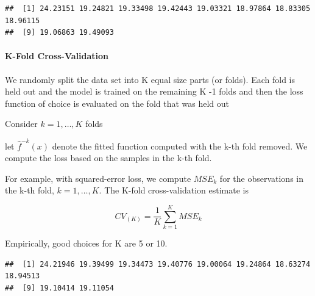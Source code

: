 \documentclass[
]{book}
\newenvironment{Shaded}{\begin{snugshade}}{\end{snugshade}}
\newcommand{\AttributeTok}[1]{\textcolor[rgb]{0.77,0.63,0.00}{#1}}
\newcommand{\CommentTok}[1]{\textcolor[rgb]{0.56,0.35,0.01}{\textit{#1}}}
\newcommand{\ControlFlowTok}[1]{\textcolor[rgb]{0.13,0.29,0.53}{\textbf{#1}}}
\newcommand{\DecValTok}[1]{\textcolor[rgb]{0.00,0.00,0.81}{#1}}
\newcommand{\FloatTok}[1]{\textcolor[rgb]{0.00,0.00,0.81}{#1}}
\newcommand{\FunctionTok}[1]{\textcolor[rgb]{0.00,0.00,0.00}{#1}}
\newcommand{\NormalTok}[1]{#1}
\newcommand{\OtherTok}[1]{\textcolor[rgb]{0.56,0.35,0.01}{#1}}
\newcommand{\SpecialCharTok}[1]{\textcolor[rgb]{0.00,0.00,0.00}{#1}}
\begin{document}
\begin{verbatim}
##  [1] 24.23151 19.24821 19.33498 19.42443 19.03321 18.97864 18.83305 18.96115
##  [9] 19.06863 19.49093
\end{verbatim}

\hypertarget{k-fold-cross-validation}{%
\paragraph{K-Fold Cross-Validation}\label{k-fold-cross-validation}}

We randomly split the data set into K equal size parts (or folds). Each fold is held out and the model is trained on the remaining K -1 folds and then the loss function of choice is evaluated on the fold that was held out

Consider \(k = 1, \dots, K\) folds

let \(\hat{f}^{-k}(x)\) denote the fitted function computed with the k-th fold removed. We compute the loss based on the samples in the k-th fold.

For example, with squared-error loss, we compute \(MSE_k\) for the observations in the k-th fold, \(k = 1,\dots,K\). The K-fold cross-validation estimate is

\[
CV_{(K)} = \frac{1}{K} \sum_{k=1}^K MSE_k
\]

Empirically, good choices for K are 5 or 10.

\begin{Shaded}
\end{Shaded}

\begin{verbatim}
##  [1] 24.21946 19.39499 19.34473 19.40776 19.00064 19.24864 18.63274 18.94513
##  [9] 19.10414 19.11054
\end{verbatim}
\end{document}
